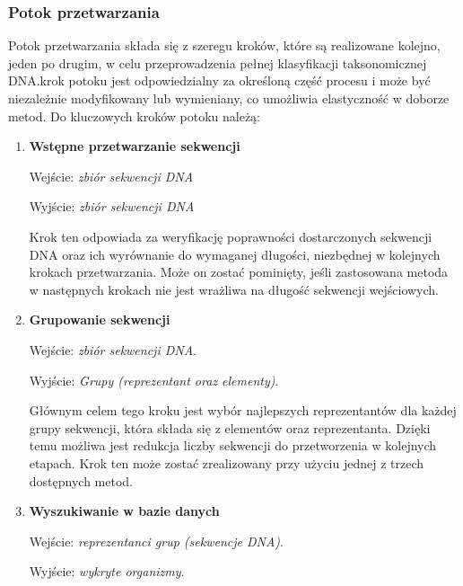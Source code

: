 
        \subsubsection{Potok przetwarzania}

            Potok przetwarzania składa się z szeregu kroków, które są realizowane kolejno, jeden po drugim, w celu przeprowadzenia pełnej klasyfikacji taksonomicznej DNA. krok potoku jest odpowiedzialny za określoną część procesu i może być niezależnie modyfikowany lub wymieniany, co umożliwia elastyczność w doborze metod. Do kluczowych kroków potoku należą:

            \begin{enumerate}
                \item {
                    \textbf{Wstępne przetwarzanie sekwencji}

                    Wejście: \textit{zbiór sekwencji DNA}

                    Wyjście: \textit{zbiór sekwencji DNA}

                    Krok ten odpowiada za weryfikację poprawności dostarczonych sekwencji DNA oraz ich wyrównanie do wymaganej długości, niezbędnej w kolejnych krokach przetwarzania. Może on zostać pominięty, jeśli zastosowana metoda w następnych krokach nie jest wrażliwa na długość sekwencji wejściowych.
                }
                \item {
                    \textbf{Grupowanie sekwencji}

                    Wejście: \textit{zbiór sekwencji DNA}.

                    Wyjście: \textit{Grupy (reprezentant oraz elementy)}.

                    Głównym celem tego kroku jest wybór najlepszych reprezentantów dla każdej grupy sekwencji, która składa się z elementów oraz reprezentanta. Dzięki temu możliwa jest redukcja liczby sekwencji do przetworzenia w kolejnych etapach. Krok ten może zostać zrealizowany przy użyciu jednej z trzech dostępnych metod.
                }
                \item {
                    \textbf{Wyszukiwanie w bazie danych}

                    Wejście: \textit{reprezentanci grup (sekwencje DNA)}.

                    Wyjście: \textit{wykryte organizmy}.

}
\end{enumerate}
